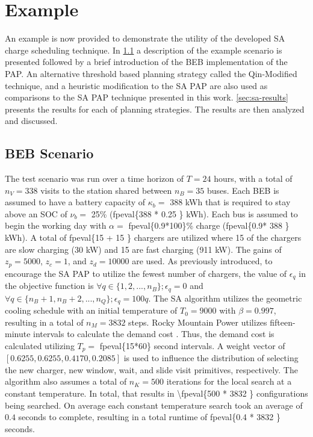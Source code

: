 \documentclass[energies,article,submit,moreauthors]{Definitions/mdpi}
\newcommand{\A}{35 }                                                            %
\newcommand{\N}{338 }                                                           %
\newcommand{\Cgain}{5000}                                                       %
\newcommand{\acharge}{0.9}                                                      %
\newcommand{\mincharge}{25\% }                                                  %
\newcommand{\minchargeD}{0.25 }                                                 %
\newcommand{\batsize}{388 }                                                     %
\newcommand{\fast}{15 }                                                         %
\newcommand{\slow}{15 }                                                         %
\newcommand{\fasts}{911 }                                                       %
\newcommand{\slows}{30 }                                                        %
\newcommand{\localcnt}{500 }                                                    %
\newcommand{\tempinit}{9000 }                                                   %
\newcommand{\tempcnt}{3832 }                                                    %
\newcommand{\quicklocal}{0.4 }                                                  %
\begin{document}
\section{Example}
\label{sec:sa-example}
An example is now provided to demonstrate the utility of the developed SA charge scheduling technique. In
\ref{sec:sa-beb-scenario} a description of the example scenario is presented followed by a brief introduction of the BEB
implementation of the PAP. An alternative threshold based planning strategy called the Qin-Modified technique, and a
heuristic modification to the SA PAP are also used as comparisons to the SA PAP technique presented in this work.
\ref{sec:sa-results} presents the results for each of planning strategies. The results are then analyzed and discussed.

\subsection{BEB Scenario}
\label{sec:sa-beb-scenario}
The test scenario was run over a time horizon of \(T=24\) hours, with a total of \(n_V = \N\) visits to the station shared
between \(n_B = \A\) buses. Each BEB is assumed to have a battery capacity of \(\kappa_b =\) \batsize kWh that is required to
stay above an SOC of \(\nu_b =\) \mincharge (\num{fpeval{\batsize * \minchargeD}} kWh). Each bus is assumed to
begin the working day with \(\alpha =\) \num{fpeval{\acharge*100}}\% charge (\num{fpeval{\acharge * \batsize}} kWh). A total of \num{fpeval{\fast + \slow}} chargers are utilized where \slow of the chargers
are slow charging (\slows kW) and \fast are fast charging (\fasts kW). The gains of \(z_p = \Cgain\), \(z_c = 1\), and \(z_d
= 10000\) are used. As previously introduced, to encourage the SA PAP to utilize the fewest number of chargers, the value
of \(\epsilon_q\) in the objective function is \(\forall q \in \{1,2,..., n_B \}; \epsilon_q = 0\) and \(\forall q \in \{n_B + 1, n_B + 2, ..., n_Q\}; \epsilon_q
= 100q\). The SA algorithm utilizes the geometric cooling schedule with an initial temperature of \(T_0 = \tempinit\) with
\(\beta = 0.997\), resulting in a total of \(n_M = \tempcnt\) steps. Rocky Mountain Power utilizes fifteen-minute intervals to
calculate the demand cost \cite{rocky-mountain-power}. Thus, the demand cost is calculated utilizing \(T_p =\)
\num{fpeval{15*60}} second intervals. A weight vector of \([0.6255, 0.6255, 0.4170, 0.2085]\) is used to
influence the distribution of selecting the new charger, new window, wait, and slide visit primitives, respectively. The
algorithm also assumes a total of \(n_K = \localcnt\) iterations for the local search at a constant temperature. In total,
that results in \num{\fpeval{\localcnt * \tempcnt}} configurations being searched. On average each constant
temperature search took an average of \(\quicklocal\) seconds to complete, resulting in a total runtime of
\num{fpeval{\quicklocal * \tempcnt}} seconds.
\end{document}
